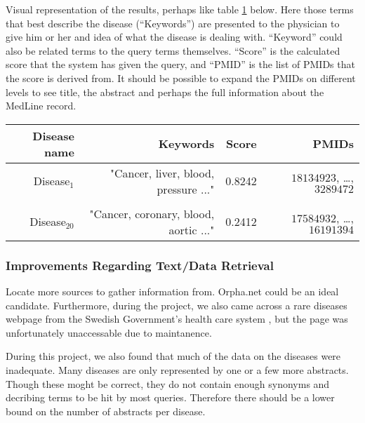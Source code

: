 Visual representation of the results, perhaps like table
\ref{FutureGUI} below. Here those terms that best
describe the disease (``Keywords'') are presented to the physician to give him or her
and idea of what the disease is dealing with. ``Keyword'' could also be related terms
to the query terms themselves. ``Score'' is the calculated score that the system has given the
query, and ``PMID'' is the list of PMIDs that the score is derived
from. It should be possible to expand the PMIDs on different levels to
see title, the abstract and perhaps the full information about the MedLine
record.
\begin{table}
\begin{tiny}
  \begin{tabular}{|r|r|r|r|}
    \hline
    Disease name & Keywords & Score & PMIDs \\
    \hline
    Disease$_1$ & "Cancer, liver, blood, pressure ..." & 0.8242 & $18134923$, \dots, $3289472$ \\
    \hline
    {} & {} & {} & {} \\
    \hline
    Disease$_20$ & "Cancer, coronary, blood, aortic ..." & 0.2412 & $17584932$, \dots, $16191394$ \\
    \hline
  \end{tabular}
  \end{tiny}
  \label{FutureGUI}
\end{table}

\subsubsection{Improvements Regarding Text/Data Retrieval}
Locate more sources to gather information from. Orpha.net could be an ideal candidate. Furthermore,
during the project, we also came across a rare diseases webpage from the Swedish 
Government's health care system \cite{Socialstyrelsen}, but the page was unfortunately unaccessable due to maintanence.

During this project, we also found that much of the data on the diseases were inadequate. Many diseases are only represented
by one or a few more abstracts. Though these moght be correct, they do not contain enough synonyms and decribing terms to
be hit by most queries. Therefore there should be a lower bound on the number of abstracts per disease.
